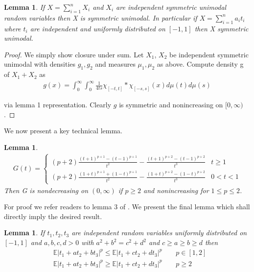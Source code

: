 \documentclass[10pt]{article}
\newcommand{\E}{\mathbb{E}}
\newcommand{\1}{\textbf{1}}
\newtheorem{lemma}[theorem]{Lemma}
\theoremstyle{remark}
\theoremstyle{definition}
\begin{document}
\begin{lemma}
	If $X = \sum_{i=1}^n X_i$ and $X_i$ are independent symmetric unimodal random variables then X is symmetric unimodal. In particular if $X = \sum_{i=1}^n a_i t_i$ where $t_i$ are independent and uniformly distributed on $[-1,1]$ then X symmetric unimodal. 
\end{lemma}

\begin{proof}
	We simply show closure under sum. Let $X_1$, $X_2$ be independent symmetric unimodal with densities $g_1,g_2$ and measures $\mu_1,\mu_2$ as above. Compute density g of $X_1 + X_2$ as 
	\begin{align*}
		g(x) = \int_0^{\infty} \int_0^{\infty} \frac{1}{4ts}\chi_{[-t,t]} * \chi_{[-s,s]}(x)d\mu(t)d\mu(s)
	\end{align*}

	via lemma 1 representation. Clearly $g$ is symmetric and nonincreasing on $[0,\infty)$. 
\end{proof}

We now present a key technical lemma.

\begin{lemma}
	\begin{align*}
		G(t)=
		\begin{cases}
			(p+2)\frac{(t+1)^{p+1}-(t-1)^{p+1}}{t^2} - \frac{(t+1)^{p+2}-(t-1)^{p+2}}{t^3} & t \geq 1\\
			(p+2)\frac{(1+t)^{p+1}+(1-t)^{p+1}}{t^2} - \frac{(1+t)^{p+2}-(1-t)^{p+2}}{t^3} & 0 < t < 1
		\end{cases}
	\end{align*}
	Then G is nondecreasing on $(0,\infty)$ if $p \geq 2$ and nonincreasing for $1 \leq p \leq 2$. 
\end{lemma}

For proof we refer readers to lemma 3 of \cite{LO}. We present the final lemma which shall directly imply the desired result.

\begin{lemma}
	If $t_1,t_2,t_3$ are independent random variables uniformly distributed on $[-1,1]$ and $a,b,c,d > 0$ with $a^2 + b^2 = c^2 + d^2$ and $c \geq a \geq b \geq d$ then
	\begin{align*}
		&\E |t_1 + at_2 + bt_3|^p \leq \E |t_1 + ct_2 + dt_3|^p \qquad p \in [1,2] \\
		&\E|t_1 + at_2 + bt_3|^p \geq \E|t_1 + ct_2 + dt_3|^p \qquad p \geq 2
	\end{align*}
\end{lemma}
\end{document}
